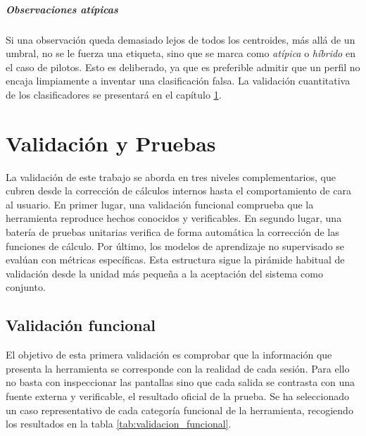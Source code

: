 \documentclass[12pt,a4paper,twoside,openright]{book}
\begin{document}
\paragraph{Observaciones atípicas}
Si una observación queda demasiado lejos de todos los centroides, más allá de un umbral, no se le fuerza una etiqueta, sino que se marca como \textit{atípica} o \textit{híbrido} en el caso de pilotos. Esto es deliberado, ya que es preferible admitir que un perfil no encaja limpiamente a inventar una clasificación falsa. La validación cuantitativa de los clasificadores se presentará en el capítulo \ref{cap:validacion}.

\chapter{Validación y Pruebas}\label{cap:validacion}
La validación de este trabajo se aborda en tres niveles complementarios, que cubren desde la corrección de cálculos internos hasta el comportamiento de cara al usuario. En primer lugar, una validación funcional comprueba que la herramienta reproduce hechos conocidos y verificables.
En segundo lugar, una batería de pruebas unitarias verifica de forma automática la corrección de las funciones de cálculo. Por último, los modelos de aprendizaje no supervisado se evalúan con métricas específicas. Esta estructura sigue la pirámide habitual de validación desde la unidad más pequeña a la aceptación del sistema como conjunto.

\section{Validación funcional}
El objetivo de esta primera validación es comprobar que la información que presenta la herramienta se corresponde con la realidad de cada sesión. Para ello no basta con inspeccionar las pantallas sino que cada salida se contrasta con una fuente externa y verificable, el resultado oficial de la prueba.
Se ha seleccionado un caso representativo de cada categoría funcional de la herramienta, recogiendo los resultados en la tabla \ref{tab:validacion_funcional}.
\end{document}
